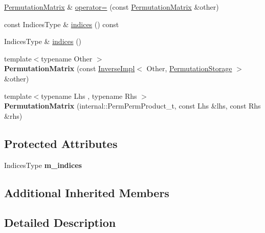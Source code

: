 \begin{DoxyCompactItemize}
\item 
\mbox{\hyperlink{class_eigen_1_1_permutation_matrix}{Permutation\+Matrix}} \& \mbox{\hyperlink{class_eigen_1_1_permutation_matrix_a09357ca4fddb406c55c2431f36552ada}{operator=}} (const \mbox{\hyperlink{class_eigen_1_1_permutation_matrix}{Permutation\+Matrix}} \&other)
\item 
const Indices\+Type \& \mbox{\hyperlink{class_eigen_1_1_permutation_matrix_a2f1ab379207fcd1ceb33941e25cf50c2}{indices}} () const
\item 
Indices\+Type \& \mbox{\hyperlink{class_eigen_1_1_permutation_matrix_ac089ead468a58d75f276ad2b253578c0}{indices}} ()
\item 
\mbox{\label{class_eigen_1_1_permutation_matrix_a831ebf7e2fde55e8bcca4b5f52808068}} 
{\footnotesize template$<$typename Other $>$ }\\{\bfseries Permutation\+Matrix} (const \mbox{\hyperlink{class_eigen_1_1_inverse_impl}{Inverse\+Impl}}$<$ Other, \mbox{\hyperlink{struct_eigen_1_1_permutation_storage}{Permutation\+Storage}} $>$ \&other)
\item 
\mbox{\label{class_eigen_1_1_permutation_matrix_affd4f6870df35b84c3994438516fcf6e}} 
{\footnotesize template$<$typename Lhs , typename Rhs $>$ }\\{\bfseries Permutation\+Matrix} (internal\+::\+Perm\+Perm\+Product\+\_\+t, const Lhs \&lhs, const Rhs \&rhs)
\end{DoxyCompactItemize}
\subsection*{Protected Attributes}
\begin{DoxyCompactItemize}
\item 
\mbox{\label{class_eigen_1_1_permutation_matrix_a9af01effdced7681e76c005327e6209a}} 
Indices\+Type {\bfseries m\+\_\+indices}
\end{DoxyCompactItemize}
\subsection*{Additional Inherited Members}


\subsection{Detailed Description}
